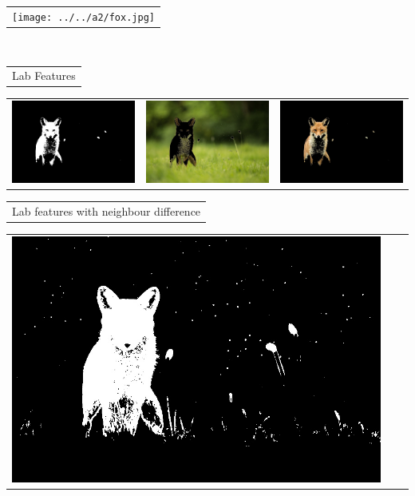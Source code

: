 \documentclass{article}
\begin{document}
\begin{center}
\begin{tabular}{c}
\texttt{[image: ../../a2/fox.jpg]}
\end{tabular}
\\
\begin{tabular}{c}

Lab Features \\
\end{tabular}
 \begin{tabular}{c c c} 

 \includegraphics[width=.4\linewidth]{../image-segmentation/output/Lab/fox_mask.jpg} & 
 
 \includegraphics[width=.4\linewidth]{../image-segmentation/output/Lab/fox_seg1.jpg} & \includegraphics[width=.4\linewidth]{../image-segmentation/output/Lab/fox_seg2.jpg} \\
  
 \end{tabular}
 \begin{tabular}{c}

Lab features with neighbour difference \\
\end{tabular}
 \begin{tabular}{c c c} 

 \includegraphics[width=.4\linewidth]{../image-segmentation/output/add-Lab-neighbor-diff-feature/fox_mask.jpg} & 
 

\end{tabular}
\end{center}
\end{document}
